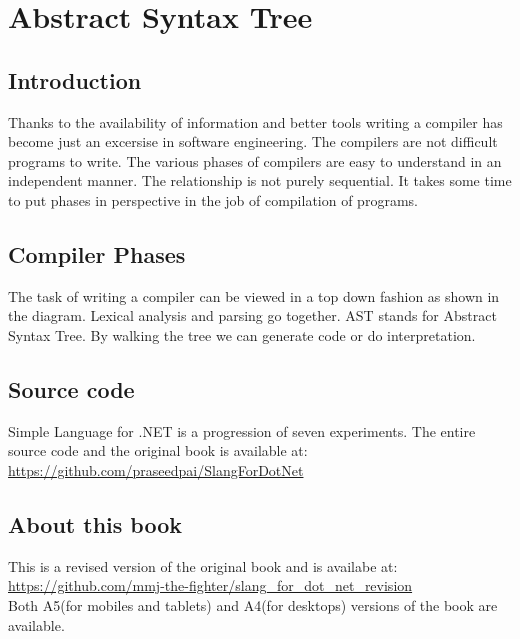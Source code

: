\chapter{Abstract Syntax Tree}
\section{Introduction}
Thanks to the availability of information and better tools writing a compiler has become just an excersise in software engineering. The compilers are not difficult programs to write. The various phases of compilers are easy to understand in an independent manner. The relationship is not purely sequential. It takes some time to put phases in perspective in the job of compilation of programs. 
\section{Compiler Phases}
The task of writing a compiler can be viewed in a top down fashion as shown in the diagram. Lexical analysis and parsing go together. AST stands for Abstract Syntax Tree. By walking the tree we can generate code or do interpretation.\\
 \section{Source code}
 Simple Language for .NET is a progression of seven experiments. The entire source code and the original book is available at:\\
 \url{https://github.com/praseedpai/SlangForDotNet}\\
 
\section{About this book}
This is a revised version of the original book and is availabe at: \url{https://github.com/mmj-the-fighter/slang_for_dot_net_revision}\\
Both A5(for mobiles and tablets) and A4(for desktops) versions of the book are available.

